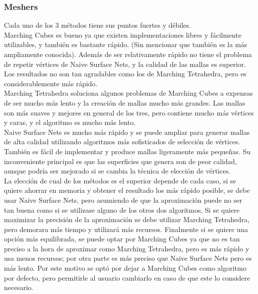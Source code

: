 \documentclass[12pt]{article}
\begin{document}
\subsubsection{Meshers}
Cada uno de los 3 métodos tiene sus puntos fuertes y débiles. 
\\Marching Cubes es bueno ya que existen implementaciones libres y fácilmente utilizables, y también es bastante rápido. (Sin mencionar que también es la más ampliamente conocida). Además de ser relativamente rápido no tiene el problema de repetir vértices de Naive Surface Nets, y la calidad de las mallas es superior. Los resultados no son tan agradables como los de Marching Tetrahedra, pero es considerablemente más rápido. 
\\Marching Tetrahedra soluciona algunos problemas de Marching Cubes a expensas de ser mucho más lento y la creación de mallas mucho más grandes. Las mallas son más suaves y mejores en general de los tres, pero contiene mucho más vértices y caras, y el algoritmo es mucho más lento.
\\Naive Surface Nets es mucho más rápido y se puede ampliar para generar mallas de alta calidad utilizando algoritmos más sofisticados de selección de vértices. También es fácil de implementar y produce mallas ligeramente más pequeñas. Su inconveniente principal es que las superficies que genera son de peor calidad, aunque podría ser mejorado si se cambia la técnica de elección de vértices. 
\\La elección de cual de los métodos es el superior depende de cada caso, si se quiere ahorrar en memoria y obtener el resultado los más rápido posible, se debe usar Naive Surface Nets, pero asumiendo de que la aproximación puede no ser tan buena como si se utilizase alguno de los otros dos algoritmos. Si se quiere maximizar la precisión de la aproximación se debe utilizar Marching Tetrahedra, pero demorara más tiempo y utilizará más recursos. Finalmente si se quiere una opción más equilibrada, se puede optar por Marching Cubes ya que no es tan preciso a la hora de aproximar como Marching Tetrahedra, pero es más rápido y usa menos recursos; por otra parte es más preciso que Naive Surface Nets pero es más lento. Por este motivo se optó por dejar a Marching Cubes como algoritmo por defecto, pero permitirle al usuario cambiarlo en caso de que este lo considere necesario.
\end{document}
